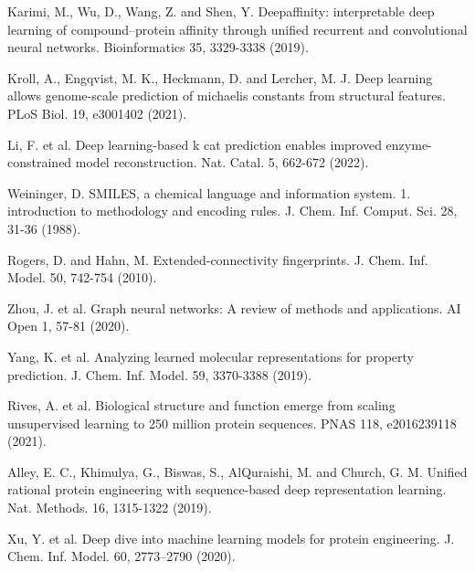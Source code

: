 \documentclass[12pt]{article}
\begin{document}
\begin{thebibliography}{20}
 Karimi, M., Wu, D., Wang, Z. and Shen, Y. Deepaffinity: interpretable deep learning of compound–protein affinity through uniﬁed recurrent and convolutional neural networks. Bioinformatics 35, 3329-3338 (2019).

 Kroll, A., Engqvist, M. K., Heckmann, D. and Lercher, M. J. Deep learning allows genome-scale prediction of michaelis constants from structural features. PLoS Biol. 19, e3001402 (2021).

 Li, F. et al. Deep learning-based k cat prediction enables improved enzyme-constrained model reconstruction. Nat. Catal. 5, 662-672 (2022).

 Weininger, D. SMILES, a chemical language and information system. 1. introduction to methodology and encoding rules. J. Chem. Inf. Comput. Sci. 28, 31-36 (1988).

 Rogers, D. and Hahn, M. Extended-connectivity ﬁngerprints. J. Chem. Inf. Model. 50, 742-754 (2010).

 Zhou, J. et al. Graph neural networks: A review of methods and applications. AI Open 1, 57-81 (2020).

 Yang, K. et al. Analyzing learned molecular representations for property prediction. J. Chem. Inf. Model. 59, 3370-3388 (2019).


 Rives, A. et al. Biological structure and function emerge from scaling unsupervised learning to 250 million protein sequences. PNAS 118, e2016239118 (2021).

 Alley, E. C., Khimulya, G., Biswas, S., AlQuraishi, M. and Church, G. M. Uniﬁed rational protein engineering with sequence-based deep representation learning. Nat. Methods. 16, 1315-1322 (2019).

 Xu, Y. et al. Deep dive into machine learning models for protein engineering. J. Chem. Inf. Model. 60, 2773–2790 (2020).

\end{thebibliography}
\end{document}

